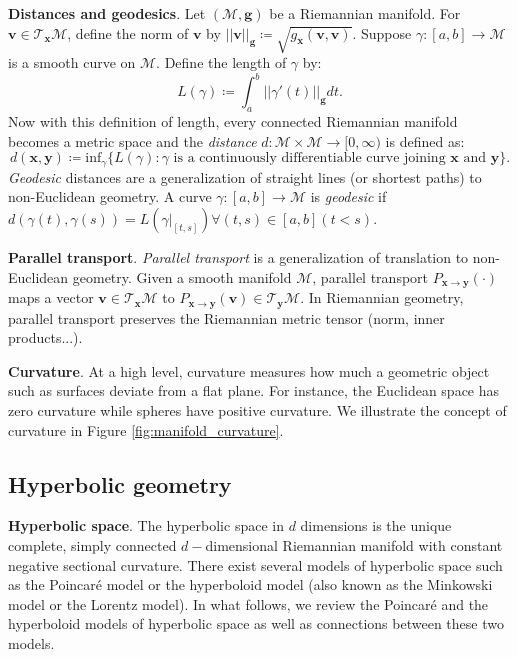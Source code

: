 \documentclass{article}
\newcommand{\xhdr}[1]{{\noindent\bfseries #1}.}
\begin{document}
\xhdr{Distances and geodesics} Let $(\mathcal{M}, \mathbf{g})$ be a Riemannian manifold. For $\mathbf{v}\in\mathcal{T}_\mathbf{x}\mathcal{M}$, define the norm of $\mathbf{v}$ by $||\mathbf{v}||_\mathbf{g} \coloneqq \sqrt{g_\mathbf{x}(\mathbf{v}, \mathbf{v})}$.
Suppose $\gamma: [a, b] \rightarrow \mathcal{M}$ is a smooth curve on $\mathcal{M}$. Define the length of $\gamma$ by: 
$$L(\gamma) \coloneqq \int_{a}^{b} ||\gamma'(t)||_\mathbf{g}dt.$$
Now with this definition of length, every connected Riemannian manifold  becomes a metric space and the \textit{distance} $d:\mathcal{M}\times\mathcal{M}\rightarrow[0,\infty)$ is defined as:
$$d(\mathbf{x}, \mathbf{y})\coloneqq\mathrm{inf}_\gamma\{L(\gamma): \gamma \text{ is a continuously differentiable curve joining }\mathbf{x}\text{ and }\mathbf{y}\}.$$
\textit{Geodesic} distances are a generalization of straight lines (or shortest paths) to non-Euclidean geometry. 
A curve $\gamma:[a,b]\rightarrow\mathcal{M}$ is \textit{geodesic} if $d(\gamma(t), \gamma(s))=L(\gamma|_{[t,s]})\forall(t,s)\in[a, b] (t<s)$.

\xhdr{Parallel transport} \textit{Parallel transport} is a generalization of translation to non-Euclidean geometry.
Given a smooth manifold $\mathcal{M}$, parallel transport $P_{\mathbf{x}\rightarrow\mathbf{y}}(\cdot)$ maps a vector $\mathbf{v}\in\mathcal{T}_\mathbf{x}\mathcal{M}$ to $P_{\mathbf{x}\rightarrow\mathbf{y}}(\mathbf{v})\in\mathcal{T}_\mathbf{y}\mathcal{M}$. 
In Riemannian geometry, parallel transport preserves the Riemannian metric tensor (norm, inner products...).

\xhdr{Curvature}
At a high level, curvature measures how much a geometric object such as surfaces deviate from a flat plane. 
For instance, the Euclidean space has zero curvature while spheres have positive curvature. 
We illustrate the concept of curvature in Figure \ref{fig:manifold_curvature}.

\subsection{Hyperbolic geometry}
\xhdr{Hyperbolic space} The hyperbolic space in $d$ dimensions is the unique complete, simply connected $d-$dimensional Riemannian manifold with constant negative sectional curvature.
There exist several models of hyperbolic space such as the Poincar\'e model or the hyperboloid model (also known as the Minkowski model or the Lorentz model).
In what follows, we review the Poincar\'e and the hyperboloid models of hyperbolic space as well as connections between these two models. 
\end{document}
